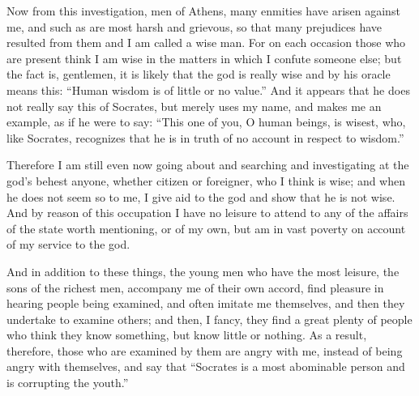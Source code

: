 Now from this investigation, men of Athens,  many enmities have arisen against me, and such as are most harsh and grievous, so that many prejudices have resulted from them and I am called a wise man. For on each occasion those who are present think I am wise in the matters in which I confute someone else; but the fact is, gentlemen, it is likely that the god is really wise and by his oracle means this: “Human wisdom is of little or no value.” And it appears that he does not really say this of Socrates, but merely uses my name,  and makes me an example, as if he were to say: “This one of you, O human beings, is wisest, who, like Socrates, recognizes that he is in truth of no account in respect to wisdom.”

Therefore I am still even now going about and searching and investigating at the god's behest anyone, whether citizen or foreigner, who I think is wise; and when he does not seem so to me, I give aid to the god and show that he is not wise. And by reason of this occupation I have no leisure to attend to any of the affairs of the state worth mentioning, or of my own, but am in vast poverty  on account of my service to the god.

And in addition to these things, the young men who have the most leisure, the sons of the richest men, accompany me of their own accord, find pleasure in hearing people being examined, and often imitate me themselves, and then they undertake to examine others; and then, I fancy, they find a great plenty of people who think they know something, but know little or nothing. As a result, therefore, those who are examined by them are angry with me, instead of being angry with themselves, and say that “Socrates is a most abominable person  and is corrupting the youth.”

